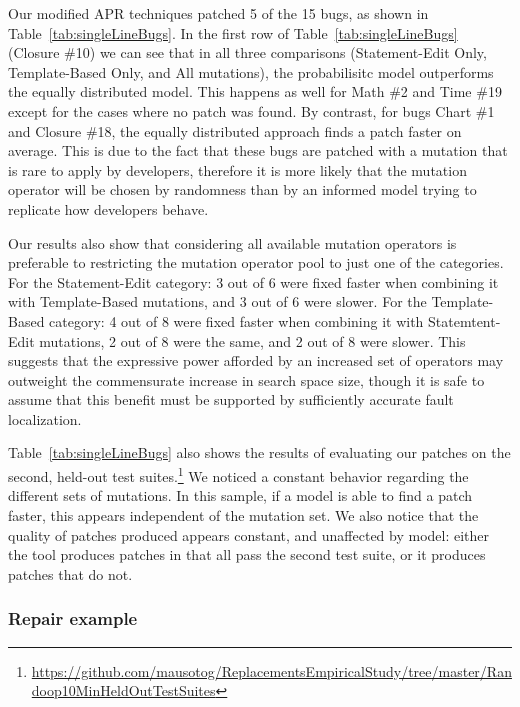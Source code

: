 \documentclass[conference]{IEEEtran}
\begin{document}
Our modified APR techniques patched 5 of the 15 bugs, as shown in 
Table~\ref{tab:singleLineBugs}. In the first row of Table~\ref{tab:singleLineBugs} (Closure \#10) we can see
that in all three comparisons (Statement-Edit Only, Template-Based Only, and All
mutations), the probabilisitc model outperforms
the equally distributed model. This happens as well for
Math \#2 and Time \#19 except for the cases where no patch was
found. By contrast, for bugs Chart \#1 and Closure \#18, the equally
distributed approach finds a patch faster on average. This is due to the fact
that these bugs are patched with a mutation that is rare to apply by developers,
therefore it is more likely that the mutation operator will be chosen by randomness
than by an informed model trying to replicate how developers behave.

Our results also show that considering all available mutation operators is
preferable to 
restricting the mutation operator pool to just one of the categories. For the
Statement-Edit category: 3 out of 6 were fixed faster when combining it with
Template-Based mutations, and 3 out of 6 were slower. For the Template-Based
category: 4 out of 8 were fixed faster when combining it with Statemtent-Edit
mutations, 2 out of 8 were the same, and 2 out of 8 were slower. This suggests
that the expressive power afforded by an increased set of operators may
outweight the commensurate increase in search space size, though it is safe to
assume that this benefit must be supported by sufficiently accurate fault
localization. 

Table~\ref{tab:singleLineBugs} also shows the results of evaluating our patches
on the second, held-out test suites.\footnote{\url{https://github.com/mausotog/ReplacementsEmpiricalStudy/tree/master/Randoop10MinHeldOutTestSuites}} We noticed a
constant behavior regarding the different sets of mutations. In this sample, if
a model is able to find a patch faster, this appears independent of the mutation
set.  We also notice that
the quality of patches produced  appears constant, and unaffected by model:
either the tool produces patches in 
that all pass the second test suite, or it produces patches that do not. 

\subsubsection{Repair example} \label{examPatches}
\end{document}
